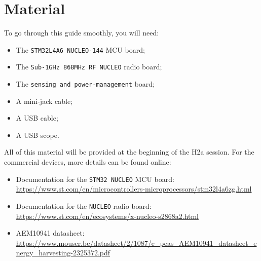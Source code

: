 \section*{Material}


To go through this guide smoothly, you will need:

\begin{itemize}
    \item The \texttt{STM32L4A6 NUCLEO-144} MCU board;
    \item The \texttt{Sub-1GHz 868MHz RF NUCLEO} radio board;
    \item The \texttt{sensing and power-management} board;
    \item A mini-jack cable;
    \item A USB cable;
    \item A USB scope.
\end{itemize}

All of this material will be provided at the beginning of the H2a session.
For the commercial devices, more details can be found online:

\begin{itemize}
    \item Documentation for the \texttt{STM32 NUCLEO} MCU board:\\ \url{https://www.st.com/en/microcontrollers-microprocessors/stm32l4a6zg.html}
    \item Documentation for the \texttt{NUCLEO} radio board: \\\url{https://www.st.com/en/ecosystems/x-nucleo-s2868a2.html}
    \item AEM10941 datasheet: \url{https://www.mouser.be/datasheet/2/1087/e_peas_AEM10941_datasheet_energy_harvesting-2325372.pdf}
\end{itemize}

